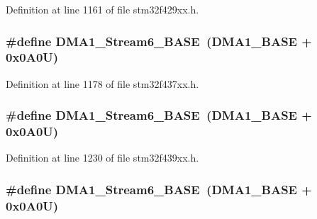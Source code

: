 Definition at line 1161 of file stm32f429xx.\+h.

\subsubsection[{\texorpdfstring{D\+M\+A1\+\_\+\+Stream6\+\_\+\+B\+A\+SE}{DMA1_Stream6_BASE}}]{\setlength{\rightskip}{0pt plus 5cm}\#define D\+M\+A1\+\_\+\+Stream6\+\_\+\+B\+A\+SE~({\bf D\+M\+A1\+\_\+\+B\+A\+SE} + 0x0\+A0\+U)}\hypertarget{group___peripheral__memory__map_ga58998ddc40adb6361704d6c9dad08125}{}\label{group___peripheral__memory__map_ga58998ddc40adb6361704d6c9dad08125}


Definition at line 1178 of file stm32f437xx.\+h.

\subsubsection[{\texorpdfstring{D\+M\+A1\+\_\+\+Stream6\+\_\+\+B\+A\+SE}{DMA1_Stream6_BASE}}]{\setlength{\rightskip}{0pt plus 5cm}\#define D\+M\+A1\+\_\+\+Stream6\+\_\+\+B\+A\+SE~({\bf D\+M\+A1\+\_\+\+B\+A\+SE} + 0x0\+A0\+U)}\hypertarget{group___peripheral__memory__map_ga58998ddc40adb6361704d6c9dad08125}{}\label{group___peripheral__memory__map_ga58998ddc40adb6361704d6c9dad08125}


Definition at line 1230 of file stm32f439xx.\+h.

\subsubsection[{\texorpdfstring{D\+M\+A1\+\_\+\+Stream6\+\_\+\+B\+A\+SE}{DMA1_Stream6_BASE}}]{\setlength{\rightskip}{0pt plus 5cm}\#define D\+M\+A1\+\_\+\+Stream6\+\_\+\+B\+A\+SE~({\bf D\+M\+A1\+\_\+\+B\+A\+SE} + 0x0\+A0\+U)}\hypertarget{group___peripheral__memory__map_ga58998ddc40adb6361704d6c9dad08125}{}\label{group___peripheral__memory__map_ga58998ddc40adb6361704d6c9dad08125}


